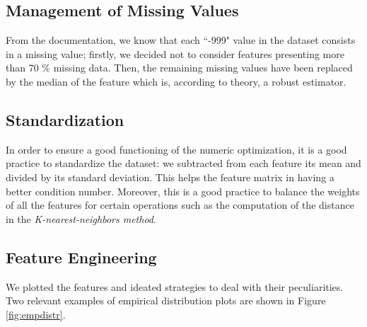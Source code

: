 \documentclass[10pt,conference,compsocconf]{IEEEtran}
\begin{document}
\subsection{Management of Missing Values}
From the documentation, we know that each ``-999" value in the dataset consists in a missing value; firstly, we decided not to consider features presenting more than 70 \% missing data. Then, the remaining missing values have been replaced by the median of the feature which is, according to theory, a robust estimator.

\subsection{Standardization}
In order to ensure a good functioning of the numeric optimization, it is a good practice to standardize the dataset: we subtracted from each feature its mean and divided by its standard deviation.
This helps the feature matrix in having a better condition number. Moreover, this is a good practice to balance the weights of all the features for certain operations such as the computation of the distance in the \emph{K-nearest-neighbors method}.

\subsection{Feature Engineering}
We plotted the features and ideated strategies to deal with their peculiarities.
Two relevant examples of empirical distribution plots are shown in Figure \ref{fig:empdistr}.
\end{document}
